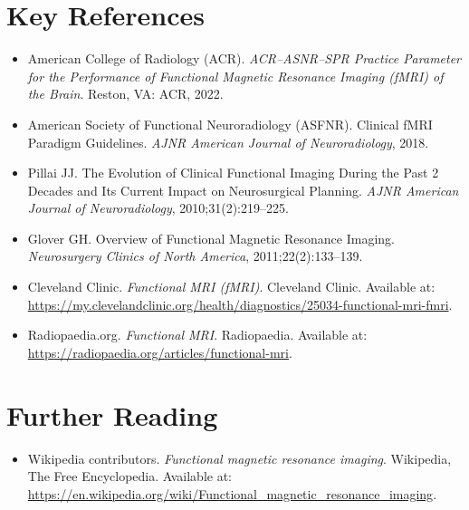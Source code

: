 \section{Key References}

\begin{itemize}
    \item American College of Radiology (ACR). \textit{ACR--ASNR--SPR Practice Parameter for the Performance of Functional Magnetic Resonance Imaging (fMRI) of the Brain}. Reston, VA: ACR, 2022.
    \item American Society of Functional Neuroradiology (ASFNR). Clinical fMRI Paradigm Guidelines. \textit{AJNR American Journal of Neuroradiology}, 2018.
    \item Pillai JJ. The Evolution of Clinical Functional Imaging During the Past 2 Decades and Its Current Impact on Neurosurgical Planning. \textit{AJNR American Journal of Neuroradiology}, 2010;31(2):219--225.
    \item Glover GH. Overview of Functional Magnetic Resonance Imaging. \textit{Neurosurgery Clinics of North America}, 2011;22(2):133--139.
    \item Cleveland Clinic. \textit{Functional MRI (fMRI)}. Cleveland Clinic. Available at: \url{https://my.clevelandclinic.org/health/diagnostics/25034-functional-mri-fmri}.
    \item Radiopaedia.org. \textit{Functional MRI}. Radiopaedia. Available at: \url{https://radiopaedia.org/articles/functional-mri}.
\end{itemize}

\section{Further Reading}
\begin{itemize}
  \item Wikipedia contributors. \textit{Functional magnetic resonance imaging}. Wikipedia, The Free Encyclopedia. Available at: \url{https://en.wikipedia.org/wiki/Functional_magnetic_resonance_imaging}.
\end{itemize}
